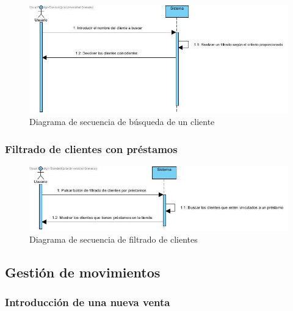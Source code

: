 \begin{figure}[H]
	\centering
	\includegraphics[width=1\textwidth]{imagenes/imagenesDiagramas/Cliente/buscarClientes.jpg}
	\caption{Diagrama de secuencia de búsqueda de un cliente}
	\label{fig:seqdiag17}
\end{figure}

\subsubsection{Filtrado de clientes con préstamos}

\begin{figure}[H]
	\centering
	\includegraphics[width=1\textwidth]{imagenes/imagenesDiagramas/Cliente/filtrarClientes.jpg}
	\caption{Diagrama de secuencia de filtrado de clientes}
	\label{fig:seqdiag18}
\end{figure}

\subsection{Gestión de movimientos}

\subsubsection{Introducción de una nueva venta}

